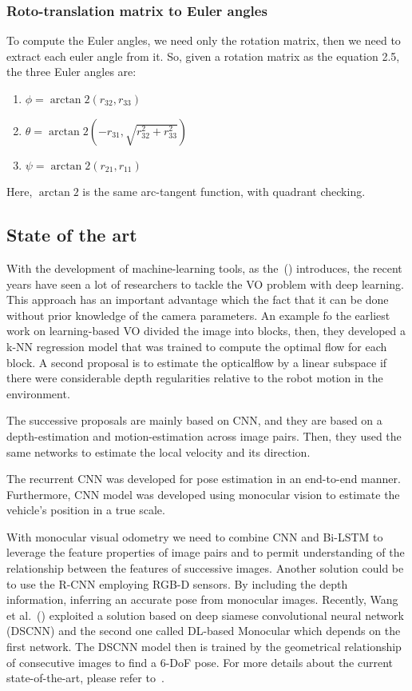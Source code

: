 \subsubsection*{Roto-translation matrix to Euler angles}
To compute the Euler angles, we need only the rotation matrix, then we need to extract each euler angle from it.
So, given a rotation matrix as the equation 2.5, the three Euler angles are:
\begin{enumerate}
    \item $\phi = \arctan2(r_{32}, r_{33})$
    \item $\theta = \arctan2(-r_{31}, \sqrt{r_{32}^2 + r_{33}^2})$
    \item $\psi = \arctan2(r_{21}, r_{11})$
\end{enumerate}
Here, $\arctan2$ is the same arc-tangent function, with quadrant checking.

\subsection{State of the art}\label{subsec:state-of-the-art}
With the development of machine-learning tools, as the~(\cite{vo_state_of_art}) introduces, the recent years have seen a lot of researchers to tackle the VO problem with deep learning.
This approach has an important advantage which the fact that it can be done without prior knowledge of the camera parameters.
An example fo the earliest work on learning-based VO divided the image into blocks, then, they developed a k-NN regression model that was trained to compute the optimal flow for each block.
A second proposal is to estimate the \gls{opticalflow} by a linear subspace if there were considerable depth regularities relative to the robot motion in the environment.

The successive proposals are mainly based on CNN, and they are based on a depth-estimation and motion-estimation across image pairs.
Then, they used the same networks to estimate the local velocity and its direction.

The recurrent CNN was developed for pose estimation in an end-to-end manner.
Furthermore, CNN model was developed using monocular vision to estimate the vehicle's position in a true scale.

With monocular visual odometry we need to combine CNN and Bi-LSTM to leverage the feature properties of image pairs and to permit understanding  of the relationship between the features of successive images.
Another solution could be to use the R-CNN employing RGB-D sensors.
By including the depth information, inferring an accurate pose from monocular images.
Recently, Wang et al.~(\cite{wang_vo}) exploited a solution based on deep siamese convolutional neural network (DSCNN) and the second one called DL-based Monocular which depends on the first network.
The DSCNN model then is trained by the geometrical relationship of consecutive images to find a 6-DoF pose.
For more details about the current state-of-the-art, please refer to~\cite{vo_state_of_art}.

